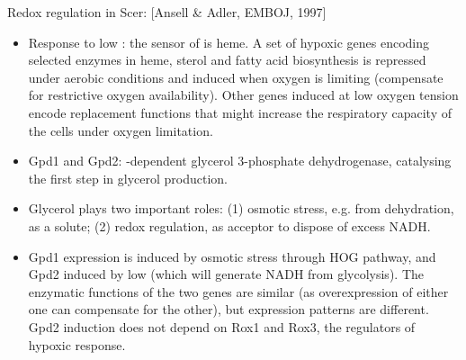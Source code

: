 \documentclass{report}
\begin{document}
Redox regulation in Scer: [Ansell \& Adler, EMBOJ, 1997]
\begin{itemize}
	\item Response to low : the sensor of  is heme. A set of hypoxic genes encoding selected enzymes in heme, sterol and fatty acid biosynthesis is repressed under aerobic conditions and induced when oxygen is limiting (compensate for restrictive oxygen availability). Other genes induced at low oxygen tension encode replacement functions that might increase the respiratory capacity of the cells under oxygen limitation. 
	\item Gpd1 and Gpd2: -dependent glycerol 3-phosphate dehydrogenase, catalysing the first step in glycerol production. 
	\item Glycerol plays two important roles: (1) osmotic stress, e.g. from dehydration, as a solute; (2) redox regulation, as  acceptor to dispose of excess NADH. 
	\item Gpd1 expression is induced by osmotic stress through HOG pathway, and Gpd2 induced by low  (which will generate NADH from glycolysis). The enzymatic functions of the two genes are similar (as overexpression of either one can compensate for the other), but expression patterns are different. Gpd2 induction does not depend on Rox1 and Rox3, the regulators of hypoxic response. 
\end{itemize}
\end{document}
